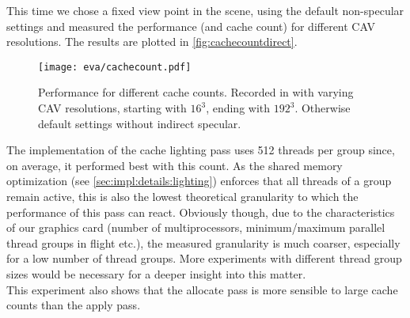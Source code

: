 \documentclass[thesis.tex]{subfiles}
\begin{document}
This time we chose a fixed view point in the  scene, using the default non-specular settings and measured the performance (and cache count) for different CAV resolutions.
The results are plotted in \autoref{fig:cachecountdirect}.
\\
\begin{figure}[h]
\centering
\texttt{[image: eva/cachecount.pdf]}
\caption{Performance for different cache counts. Recorded in  with varying CAV resolutions, starting with $16^3$, ending with $192^3$. Otherwise default settings without indirect specular. }
\label{fig:cachecountdirect}
\end{figure}
The implementation of the cache lighting pass uses 512 threads per group since, on average, it performed best with this count.
As the shared memory optimization (see \autoref{sec:impl:details:lighting}) enforces that all threads of a group remain active, this is also the lowest theoretical granularity to which the performance of this pass can react.
Obviously though, due to the characteristics of our graphics card (number of multiprocessors, minimum/maximum parallel thread groups in flight etc.), the measured granularity is much coarser, especially for a low number of thread groups.
More experiments with different thread group sizes would be necessary for a deeper insight into this matter.
\\
This experiment also shows that the allocate pass is more sensible to large cache counts than the apply pass.
\end{document}
